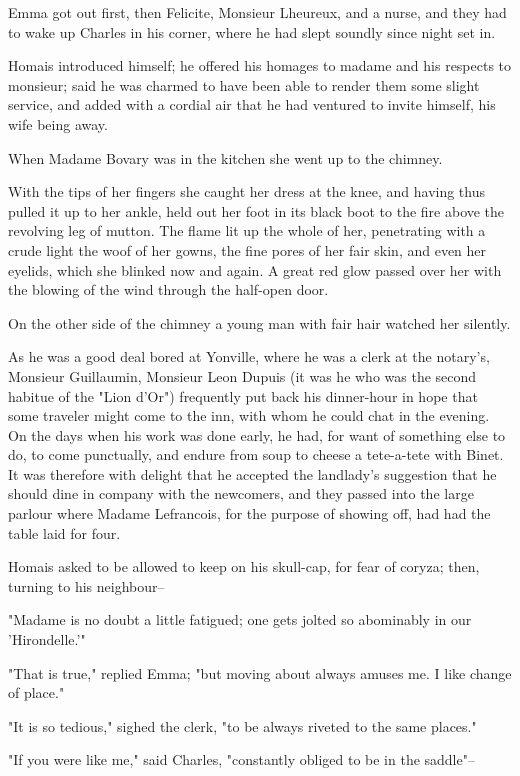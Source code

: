 \documentclass[11pt,twocolumn]{ltugboat}
\begin{document}
Emma got out first, then Felicite, Monsieur Lheureux, and a nurse, and
they had to wake up Charles in his corner, where he had slept soundly
since night set in.

Homais introduced himself; he offered his homages to madame and his
respects to monsieur; said he was charmed to have been able to render
them some slight service, and added with a cordial air that he had
ventured to invite himself, his wife being away.

When Madame Bovary was in the kitchen she went up to the chimney.

With the tips of her fingers she caught her dress at the knee, and
having thus pulled it up to her ankle, held out her foot in its black
boot to the fire above the revolving leg of mutton. The flame lit up the
whole of her, penetrating with a crude light the woof of her gowns, the
fine pores of her fair skin, and even her eyelids, which she blinked now
and again. A great red glow passed over her with the blowing of the wind
through the half-open door.

On the other side of the chimney a young man with fair hair watched her
silently.

As he was a good deal bored at Yonville, where he was a clerk at the
notary's, Monsieur Guillaumin, Monsieur Leon Dupuis (it was he who
was the second habitue of the "Lion d'Or") frequently put back his
dinner-hour in hope that some traveler might come to the inn, with whom
he could chat in the evening. On the days when his work was done early,
he had, for want of something else to do, to come punctually, and endure
from soup to cheese a tete-a-tete with Binet. It was therefore with
delight that he accepted the landlady's suggestion that he should dine
in company with the newcomers, and they passed into the large parlour
where Madame Lefrancois, for the purpose of showing off, had had the
table laid for four.

Homais asked to be allowed to keep on his skull-cap, for fear of coryza;
then, turning to his neighbour--

"Madame is no doubt a little fatigued; one gets jolted so abominably in
our 'Hirondelle.'"

"That is true," replied Emma; "but moving about always amuses me. I like
change of place."

"It is so tedious," sighed the clerk, "to be always riveted to the same
places."

"If you were like me," said Charles, "constantly obliged to be in the
saddle"--
\end{document}
